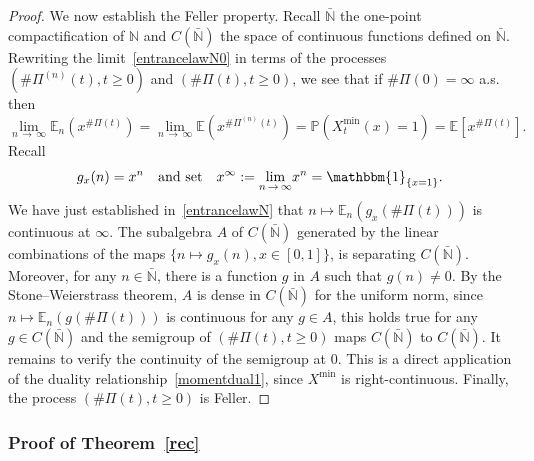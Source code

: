 \documentclass[10pt]{amsart}
\theoremstyle{definition}\newtheorem{defi}[theo]{Definition}\newtheorem{rema}[theo]{Remark}\newtheorem{exam}[theo]{Example}\newtheorem{exem}[theo]{Example}\newtheorem{nota}[theo]{Notation}
\newcommand{\bbmun}{\mathbbm{1}}
\newcommand{\bbN}{\mathbb{N}}
\newcommand{\bbE}{\mathbb{E}}
\newcommand{\bbP}{\mathbb{P}}
\begin{document}
\begin{proof}
We now establish the Feller property. Recall $\bar{\bbN}$ the one-point compactification of $\bbN$ and $C(\bar{\bbN})$ the space of continuous functions defined on $\bar{\bbN}$. Rewriting the limit~\eqref{entrancelawN0} in terms of the processes $(\#\Pi^{(n)}(t),t\geq 0)$ and $(\#\Pi(t),t\geq 0)$, we see that if $\#\Pi(0)=\infty$ a.s. then
\begin{equation}\label{entrancelawN}
\underset{n\,\rightarrow\,\infty}{\lim} \bbE_n\left(x^{\#\Pi(t)}\right)=\underset{n\,\rightarrow\,\infty}{\lim} \bbE\left(x^{\#\Pi^{(n)}(t)}\right)=\bbP(X_t^{\min}(x)=1)=\bbE\left[x^{\#\Pi(t)}\right].
\end{equation}
Recall
\[
g_x(n)=x^{n}\quad \text{and set}\quad x^{\infty}:=\underset{n\,\rightarrow\,\infty}{\lim} x^{n}=\bbmun_{\{x=1\}}.
\]
We have just established in~\eqref{entrancelawN} that $n\mapsto \bbE_n(g_x(\#\Pi(t)))$ is continuous at $\infty$. The subalgebra $A$ of $C(\bar{\bbN})$ generated by the linear combinations of the maps $\{n\mapsto g_x(n), x\in [0,1]\}$, is separating $C(\bar{\bbN})$. Moreover, for any $n\in \bar{\bbN}$, there is a function $g$ in $A$ such that $g(n)\neq 0$. By the Stone--Weierstrass theorem, $A$ is dense in $C(\bar{\bbN})$ for the uniform norm, since $n\mapsto \bbE_n(g(\#\Pi(t))) $ is continuous for any $g\in A$, this holds true for any $g\in C(\bar{\bbN})$ and the semigroup of $(\#\Pi(t),t\geq 0)$ maps $C(\bar{\bbN})$ to $C(\bar{\bbN})$. It remains to verify the continuity of the semigroup at $0$. This is a direct application of the duality relationship~\eqref{momentdual1}, since $X^{\min}$ is right-continuous. Finally, the process $(\#\Pi(t),t\geq 0)$ is Feller.
\end{proof}

\subsubsection{Proof of Theorem~\ref{rec}}
\end{document}
